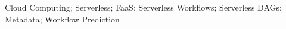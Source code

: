 \acresetall
\noindent Cloud Computing; Serverless; FaaS; Serverless Workflows; Serverless DAGs; Metadata; Workflow Prediction
